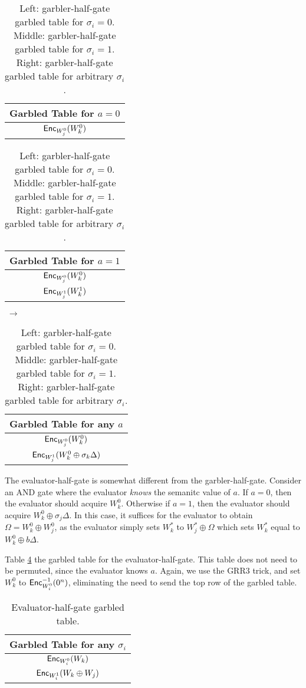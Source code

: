 \begin{table}[]
    \label{tbl:halfgate-gg-garb}
    \centering
    \begin{tabular}{|c|}
        \hline
        Garbled Table for $a = 0$ \\
        \hline
        $\textsf{Enc}_{W_j^0}(W_k^0)$ \\
        \hline
    \end{tabular}
    \begin{tabular}{|c|}
        \hline
        Garbled Table for $a = 1$ \\
        \hline
        $\textsf{Enc}_{W_j^0}(W_k^0)$ \\
        $\textsf{Enc}_{W_j^1}(W_k^1)$ \\
        \hline
    \end{tabular} $\;\rightarrow$
    \begin{tabular}{|c|}
        \hline
        Garbled Table for any $a$ \\
        \hline
        $\textsf{Enc}_{W_j^0}(W_k^0)$ \\
        $\textsf{Enc}_{W_j^1}(W_k^0 \oplus \sigma_k\Delta)$ \\
        \hline
    \end{tabular}
    \caption{Left: garbler-half-gate garbled table for $\sigma_i = 0$. Middle: garbler-half-gate garbled table for $\sigma_i = 1$. Right: garbler-half-gate garbled table for arbitrary $\sigma_i$.}
\end{table}

The evaluator-half-gate is somewhat different from the garbler-half-gate.
Consider an AND gate where the evaluator \textit{knows} the semanitc value of $a$.
If $a = 0$, then the evaluator should acquire $W_k^0$. 
Otherwise if $a = 1$, then the evaluator should acquire $W_k^0 \oplus \sigma_j\Delta$.
In this case, it suffices for the evaluator to obtain $\Omega = W_k^0 \oplus W_j^0$, as the evaluator simply sets $W_k^*$ to $W_j^* \oplus \Omega$ which sets $W_k^*$ equal to $W_k^0 \oplus b\Delta$.

Table \ref{tbl:halfgate-gg-eval} the garbled table for the evaluator-half-gate.
This table does not need to be permuted, since the evaluator knows $a$.
Again, we use the GRR3 trick, and set $W_k^0$ to $\textsf{Enc}^{-1}_{W_i^0}(0^n)$, eliminating the need to send the top row of the garbled table.

\begin{table}[h]
    \label{tbl:halfgate-gg-eval}
    \centering
    \begin{tabular}{|c|}
        \hline
        Garbled Table for any $\sigma_i$ \\
        \hline
        $\textsf{Enc}_{W_i^0}(W_k)$ \\
        $\textsf{Enc}_{W_i^1}(W_k \oplus W_j)$ \\
        \hline
    \end{tabular}
    \caption{Evaluator-half-gate garbled table.}
\end{table}

